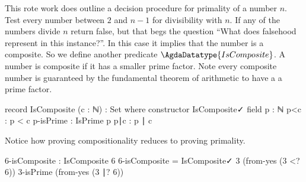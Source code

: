 \documentclass[./Thesis.tex]{subfiles}
\begin{document}
This rote work does outline a decision procedure for primality of a number $n$. Test every
number between $2$ and $n - 1$ for divisibility with $n$. If any of the numbers
divide $n$ return false, but that begs the question ``What does falsehood
represent in this instance?''. In this case it implies that the number is a
composite. So we define another predicate $\AgdaDatatype{IsComposite}$. A number
is composite if it has a smaller prime factor. Note every composite number is
guaranteed by the fundamental theorem of arithmetic to have a a prime factor. 
\begin{code}
  record IsComposite (c : ℕ) : Set where
    constructor IsComposite✓
    field
      p : ℕ
      p<c : p < c
      p-isPrime : IsPrime p
      p∣c : p ∣ c
\end{code}
Notice how proving compositionality reduces to proving primality.
\begin{code}
  6-isComposite : IsComposite 6
  6-isComposite = IsComposite✓ 3 (from-yes (3 <? 6)) 3-isPrime (from-yes (3 ∣? 6))
\end{code}
\end{document}
